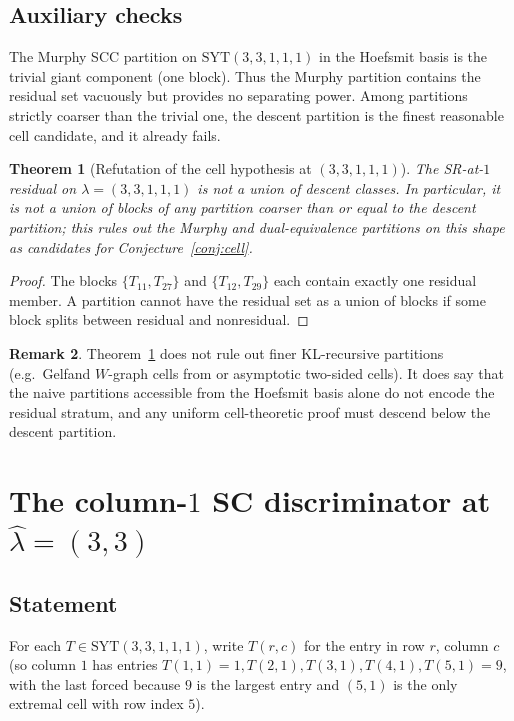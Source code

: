 \documentclass[11pt]{article}
\newtheorem{theorem}{Theorem}
\theoremstyle{definition}
\newtheorem{remark}[theorem]{Remark}
\newcommand{\la}{\lambda}
\newcommand{\hla}{\hat{\lambda}}
\newcommand{\SYT}{\mathrm{SYT}}
\begin{document}
\subsection{Auxiliary checks}
The Murphy SCC partition on $\SYT(3,3,1,1,1)$ in the Hoefsmit basis
is the trivial giant component (one block). Thus the Murphy partition
contains the residual set vacuously but provides no separating power.
Among partitions strictly coarser than the trivial one, the descent
partition is the finest reasonable cell candidate, and it already
fails.

\begin{theorem}[Refutation of the cell hypothesis at $(3,3,1,1,1)$]
\label{thm:cell-refuted}
The SR-at-$1$ residual on $\la = (3,3,1,1,1)$ is not a union of
descent classes. In particular, it is not a union of blocks of any
partition coarser than or equal to the descent partition; this rules
out the Murphy and dual-equivalence partitions on this shape as
candidates for Conjecture~\ref{conj:cell}.
\end{theorem}

\begin{proof}
The blocks $\{T_{11}, T_{27}\}$ and $\{T_{12}, T_{29}\}$ each
contain exactly one residual member. A partition cannot have the
residual set as a union of blocks if some block splits between
residual and nonresidual.
\end{proof}

\begin{remark}
Theorem~\ref{thm:cell-refuted} does not rule out finer
KL-recursive partitions (e.g.\ Gelfand $W$-graph cells from
\cite{DaiZhang} or asymptotic two-sided cells). It does say that the
naive partitions accessible from the Hoefsmit basis alone do not
encode the residual stratum, and any uniform cell-theoretic proof
must descend below the descent partition.
\end{remark}

\section{The column-$1$ SC discriminator at $\hla = (3, 3)$}

\subsection{Statement}
For each $T \in \SYT(3,3,1,1,1)$, write $T(r, c)$ for the entry in
row $r$, column $c$ (so column $1$ has entries
$T(1,1) = 1, T(2,1), T(3,1), T(4,1), T(5,1) = 9$, with the last
forced because $9$ is the largest entry and $(5, 1)$ is the only
extremal cell with row index $5$).
\end{document}

